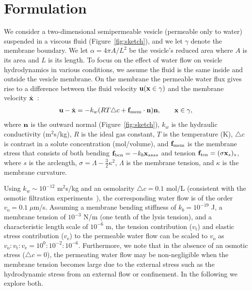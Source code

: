 \documentclass[prb,preprint,showpacs,preprintnumbers,amsmath,amssymb,longbibliography]{revtex4-1}
\begin{document}
\section{Formulation\label{sec:formulation}}
We consider a two-dimensional semipermeable vesicle (permeable only to
water) suspended in a viscous fluid (Figure~\ref{fig:sketch}), and we
let $\gamma$ denote the membrane boundary. We let
$\alpha=4\pi A/L^2$ be the vesicle's reduced area where $A$ is its area
and $L$ is its length. To focus on the effect of water flow on vesicle
hydrodynamics in various conditions, we assume the fluid is the same
inside and outside the vesicle membrane. On the membrane the permeable
water flux gives rise to a difference between the fluid velocity
${\mathbf{u}}({\mathbf{x}}\in \gamma)$ and the membrane velocity
$\dot{\mathbf{x}}$~\cite{yao-mor2017}:
\begin{align}
\label{eq:water_flux}
  \mathbf{u} - \dot{\mathbf{x}} = - k_w (R T \triangle c + \mathbf{f}_\mathrm{mem} \cdot \mathbf{n}) \mathbf{n}, \qquad
  \mathbf{x} \in \gamma,
\end{align}
where $\mathbf{n}$ is the outward normal (Figure~\ref{fig:sketch}), $k_w$ is
the hydraulic conductivity (m$^2$s/kg), $R$ is the ideal gas constant,
$T$ is the temperature (K), $\triangle c$ is contrast in a solute
concentration (mol/volume), and $\mathbf{f}_\mathrm{mem}$ is the membrane
stress that consists of both bending $ \mathbf{f}_\mathrm{ben}= -k_b
\mathbf{x}_{ssss}$ and tension $\mathbf{f}_\mathrm{ten}=(\sigma \mathbf{x}_s)_s$, where $s$
is the arclength, $\sigma = \Lambda - \frac{3}{2}\kappa^2$, $\Lambda$ is the
membrane tension, and $\kappa$ is the membrane curvature. 

Using $k_w\sim 10^{-12}$ m$^2$s/kg 
and an osmolarity $\triangle c = 0.1$ mol/L (consistent with the osmotic
filtration experiments~\cite{OlbrichRawiczNeedhamEtAl2000_BJ}), the
corresponding water flow is of the order $v_\mathrm{o}=0.1 \; \mu$m/s.
Assuming a membrane bending stiffness of $k_b = 10^{-19}$ J, a membrane
tension of $10^{-3}$ N/m (one tenth of the lysis tension), and a
characteristic length scale of $10^{-6}$ m, the tension contribution
($v_\mathrm{t}$) and elastic stress contribution ($v_\mathrm{e}$) to the
permeable water flow can be scaled to $v_\mathrm{o}$ as
$v_\mathrm{o}:v_\mathrm{t}:v_\mathrm{e}=10^{0}:10^{-2}:10^{-6}$.
Furthermore, we note that in the absence of an osmotic stress
($\triangle c = 0$), the permeating water flow may be non-negligible
when the membrane tension becomes large due to the external stress such
as the hydrodynamic stress from an external flow or confinement. In the
following we explore both.
\end{document}
